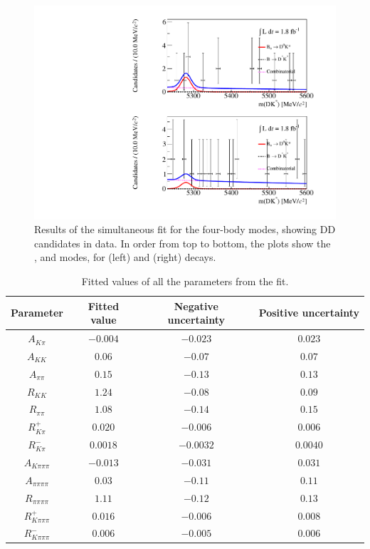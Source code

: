 \begin{figure}
\includegraphics[trim = 0 0 0 0.5\imageheight{},clip,width=0.5\linewidth]{figures/results/canvas_d2pikpipi_DD_run2.pdf}
\caption{Results of the simultaneous fit for the four-body modes, showing DD candidates in \runtwo data. In order from top to bottom, the plots show the \kpipipi, \pipipipi and \pikpipi modes, for \Bp (left) and \Bm (right) decays.}
\label{results4body}
\end{figure}

\begin{table}[h]
\centering
{\footnotesize
\begin{tabular}{cccc}
Parameter & Fitted value & Negative uncertainty & Positive uncertainty \\
\hline
$A_{K\pi}$ & $-0.004$ & $-0.023$ & $0.023$ \\
$A_{KK}$ & $0.06$ & $-0.07$ & $0.07$ \\
$A_{\pi\pi}$ & $0.15$ & $-0.13$ & $0.13$ \\
$R_{KK}$ & $1.24$ & $-0.08$ & $0.09$ \\
$R_{\pi\pi}$ & $1.08$ & $-0.14$ & $0.15$ \\
$R^+_{K\pi}$ & $0.020$ & $-0.006$ & $0.006$ \\
$R^-_{K\pi}$ & $0.0018$ & $-0.0032$ & $0.0040$ \\
$A_{K\pi\pi\pi}$ & $-0.013$ & $-0.031$ & $0.031$ \\
$A_{\pi\pi\pi\pi}$ & $0.03$ & $-0.11$ & $0.11$ \\
$R_{\pi\pi\pi\pi}$ & $1.11$ & $-0.12$ & $0.13$ \\
$R^+_{K\pi\pi\pi}$ & $0.016$ & $-0.006$ & $0.008$ \\
$R^-_{K\pi\pi\pi}$ & $0.006$ & $-0.005$ & $0.006$ \\
\end{tabular}}
\caption{Fitted values of all the \CP parameters from the \CP fit.}
\label{cpfitresultsphysics}
\end{table}

